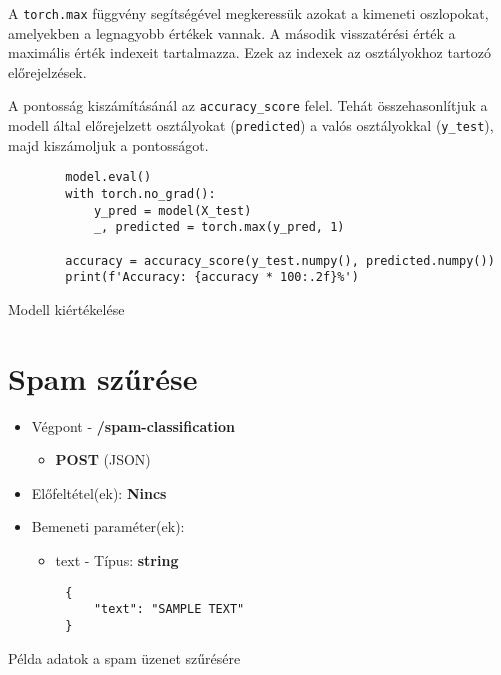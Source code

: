 \newpage
\begin{flushleft}
    A \verb|torch.max| függvény segítségével megkeressük azokat a kimeneti oszlopokat, amelyekben a legnagyobb értékek vannak. A második visszatérési érték a maximális érték indexeit tartalmazza. Ezek az indexek az osztályokhoz tartozó előrejelzések.
\end{flushleft}
\begin{flushleft}
    A pontosság kiszámításánál az \verb|accuracy_score| felel. Tehát összehasonlítjuk a modell által előrejelzett osztályokat (\verb|predicted|) a valós osztályokkal (\verb|y_test|), majd kiszámoljuk a pontosságot.
\end{flushleft}
\begin{listing}[H]
    \begin{verbatim}
        model.eval()
        with torch.no_grad():
            y_pred = model(X_test)
            _, predicted = torch.max(y_pred, 1)

        accuracy = accuracy_score(y_test.numpy(), predicted.numpy())
        print(f'Accuracy: {accuracy * 100:.2f}%')
    \end{verbatim}
    \caption{Modell kiértékelése}
    \label{code:eval}
\end{listing}

\section{Spam szűrése}
\begin{itemize}
    \item Végpont - \textbf{/spam-classification}
    \begin{itemize}
        \item \textbf{POST} (JSON)
    \end{itemize}
    \item Előfeltétel(ek): \textbf{Nincs}
\end{itemize}
\begin{itemize}
    \item Bemeneti paraméter(ek):
    \begin{itemize}
        \item text - Típus: \textbf{string}
    \end{itemize}
\end{itemize}
\begin{listing}[H]
    \begin{verbatim}
        {
            "text": "SAMPLE TEXT"
        }
    \end{verbatim}
    \caption{Példa adatok a spam üzenet szűrésére}
    \label{code:json_mailbox_one}
\end{listing}